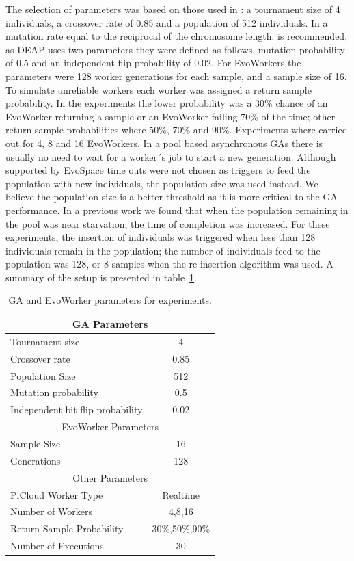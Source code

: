 \documentclass{sig-alternate}
\begin{document}
The selection of parameters was based on those used in \cite{Alba:2002dq}: a
tournament size of 4 individuals, a crossover rate of 0.85 and a
population of 512 individuals. In  \cite{Jong:PS97} a mutation rate
equal to the reciprocal of the chromosome length; is recommended, as
DEAP uses two parameters they were defined as follows, mutation
probability of 0.5 and an independent flip probability of 0.02. For
EvoWorkers the parameters were 128 worker generations for each
sample, and a sample size of 16. To simulate unreliable workers each worker 
was assigned a return sample probability. In the experiments the lower 
probability was a 30\% chance of an EvoWorker returning a sample or
an EvoWorker failing 70\% of the time; other return sample probabilities
where 50\%, 70\% and 90\%. Experiments where carried out for 4, 
8 and 16 EvoWorkers. In a pool based  asynchronous GAs there is usually no need 
to wait for a worker´s job to start a new generation. Although supported by EvoSpace
time outs were not chosen as triggers to feed the population with new
individuals, the population size was used instead. We believe the population
size is a better threshold as it is more critical to the GA performance. 
In a previous work we found that when the population remaining in the pool 
was near starvation, the time of completion was increased. For these 
experiments, the insertion of individuals was triggered when less than 128
individuals remain in the population; the number of individuals feed to the
population was 128, or 8 samples when the re-insertion algorithm
was used. A summary of the setup is presented in table~\ref{params}.

\begin{table}[!t]
\renewcommand{\arraystretch}{1.3}
\caption{GA and EvoWorker parameters for experiments.}
\label{params}
\centering
\begin{tabular}{|l|c|}
\hline
\multicolumn{2}{|c|}{GA Parameters} \\
\hline
Tournament size & 4 \\
Crossover rate & 0.85  \\
Population Size & 512 \\
Mutation probability & 0.5 \\
Independent bit flip probability  & 0.02 \\
\hline
\multicolumn{2}{|c|}{EvoWorker Parameters} \\
\hline
Sample Size & 16 \\
Generations & 128 \\
\hline
\multicolumn{2}{|c|}{Other Parameters} \\
\hline
PiCloud Worker Type & Realtime \\
Number of Workers & 4,8,16 \\
Return Sample Probability & 30\%,50\%,90\% \\
Number of Executions & 30 \\

\hline

\end{tabular}
\end{table}
\end{document}

